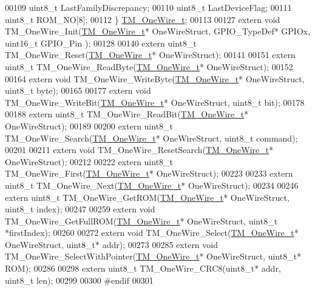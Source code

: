 \begin{DoxyCode}
00109     uint8\_t LastFamilyDiscrepancy;
00110     uint8\_t LastDeviceFlag;
00111     uint8\_t ROM\_NO[8];
00112 \} \hyperlink{struct_t_m___one_wire__t}{TM\_OneWire\_t};
00113 
00127 \textcolor{keyword}{extern} \textcolor{keywordtype}{void} TM\_OneWire\_Init(\hyperlink{struct_t_m___one_wire__t}{TM\_OneWire\_t}* OneWireStruct, GPIO\_TypeDef* GPIOx, uint16\_t GPIO\_Pin
      );
00128 
00140 \textcolor{keyword}{extern} uint8\_t TM\_OneWire\_Reset(\hyperlink{struct_t_m___one_wire__t}{TM\_OneWire\_t}* OneWireStruct);
00141 
00151 \textcolor{keyword}{extern} uint8\_t TM\_OneWire\_ReadByte(\hyperlink{struct_t_m___one_wire__t}{TM\_OneWire\_t}* OneWireStruct);
00152 
00164 \textcolor{keyword}{extern} \textcolor{keywordtype}{void} TM\_OneWire\_WriteByte(\hyperlink{struct_t_m___one_wire__t}{TM\_OneWire\_t}* OneWireStruct, uint8\_t byte);
00165 
00177 \textcolor{keyword}{extern} \textcolor{keywordtype}{void} TM\_OneWire\_WriteBit(\hyperlink{struct_t_m___one_wire__t}{TM\_OneWire\_t}* OneWireStruct, uint8\_t bit);
00178 
00188 \textcolor{keyword}{extern} uint8\_t TM\_OneWire\_ReadBit(\hyperlink{struct_t_m___one_wire__t}{TM\_OneWire\_t}* OneWireStruct);
00189 
00200 \textcolor{keyword}{extern} uint8\_t TM\_OneWire\_Search(\hyperlink{struct_t_m___one_wire__t}{TM\_OneWire\_t}* OneWireStruct, uint8\_t command);
00201 
00211 \textcolor{keyword}{extern} \textcolor{keywordtype}{void} TM\_OneWire\_ResetSearch(\hyperlink{struct_t_m___one_wire__t}{TM\_OneWire\_t}* OneWireStruct);
00212 
00222 \textcolor{keyword}{extern} uint8\_t TM\_OneWire\_First(\hyperlink{struct_t_m___one_wire__t}{TM\_OneWire\_t}* OneWireStruct);
00223 
00233 \textcolor{keyword}{extern} uint8\_t TM\_OneWire\_Next(\hyperlink{struct_t_m___one_wire__t}{TM\_OneWire\_t}* OneWireStruct);
00234 
00246 \textcolor{keyword}{extern} uint8\_t TM\_OneWire\_GetROM(\hyperlink{struct_t_m___one_wire__t}{TM\_OneWire\_t}* OneWireStruct, uint8\_t index);
00247 
00259 \textcolor{keyword}{extern} \textcolor{keywordtype}{void} TM\_OneWire\_GetFullROM(\hyperlink{struct_t_m___one_wire__t}{TM\_OneWire\_t}* OneWireStruct, uint8\_t *firstIndex);
00260 
00272 \textcolor{keyword}{extern} \textcolor{keywordtype}{void} TM\_OneWire\_Select(\hyperlink{struct_t_m___one_wire__t}{TM\_OneWire\_t}* OneWireStruct, uint8\_t* addr);
00273 
00285 \textcolor{keyword}{extern} \textcolor{keywordtype}{void} TM\_OneWire\_SelectWithPointer(\hyperlink{struct_t_m___one_wire__t}{TM\_OneWire\_t}* OneWireStruct, uint8\_t* ROM);
00286 
00298 \textcolor{keyword}{extern} uint8\_t TM\_OneWire\_CRC8(uint8\_t* addr, uint8\_t len);
00299 
00300 \textcolor{preprocessor}{#endif}
00301 
\end{DoxyCode}
